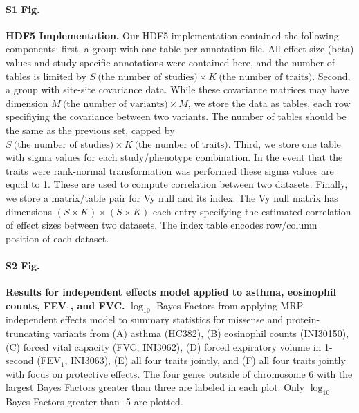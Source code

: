 \paragraph*{S1 Fig.}
\label{hdf5_fig}
{\bf HDF5 Implementation.} Our HDF5 implementation contained the following components: first, a group with one table per annotation file. All effect size (beta) values and study-specific annotations were contained here, and the number of tables is limited by $S\ \textrm{(the number of studies)} \times K\ \textrm{(the number of traits)}$. Second, a group with site-site covariance data. While these covariance matrices may have dimension $M\ \textrm{(the number of variants)} \times M$, we store the data as tables, each row specifiying the covariance between two variants. The number of tables should be the same as the previous set, capped by $S\ \textrm{(the number of studies)} \times K\ \textrm{(the number of traits)}$. Third, we store one table with sigma values for each study/phenotype combination. In the event that the traits were rank-normal transformation was performed these sigma values are equal to 1. These are used to compute correlation between two datasets. Finally, we store a matrix/table pair for Vy null and its index. The Vy null matrix has dimensions $ (S \times K) \times (S \times K)$ each entry specifying the estimated correlation of effect sizes between two datasets. The index table encodes row/column position of each dataset.

\paragraph*{S2 Fig.}
\label{asthma_independent}
{\bf Results for independent effects model applied to asthma, eosinophil counts, FEV$_1$, and FVC.} $\log_{10}$ Bayes Factors from applying MRP independent effects model to summary statistics for missense and protein-truncating variants from (A) asthma (HC382), (B) eosinophil counts (INI30150), (C) forced vital capacity (FVC, INI3062), (D) forced expiratory volume in 1-second (FEV$_1$, INI3063), (E) all four traits jointly, and (F) all four traits jointly with focus on protective effects. The four genes outside of chromosome 6 with the largest Bayes Factors greater than three are labeled in each plot. Only $\log_{10}$ Bayes Factors greater than -5 are plotted.

